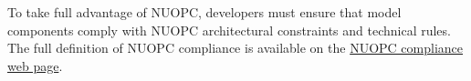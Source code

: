 \documentclass[oneside,11pt]{memoir}
\begin{document}
To take full advantage of NUOPC, developers must ensure that model components comply with NUOPC architectural constraints and technical rules. The full definition of NUOPC compliance is available on the \href{http://earthsystemcog.org/projects/nuopc/esmf2nuopc}{NUOPC compliance web page}. 


%
%
%
%
%
%
%
%
%
%
%
%
%
%
%
\end{document}
